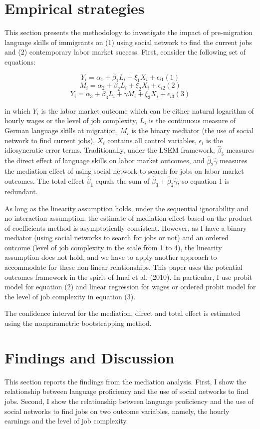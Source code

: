 \documentclass[12pt,a4paper]{article}
\begin{document}
\section{Empirical strategies}

This section presents the methodology to investigate the impact of pre-migration language skills of immigrants on (1) using social network to find the current jobs and (2) contemporary labor market success. First, consider the following set of equations:

$$Y_{i} = \alpha_{1} + \beta_{1}L_{i} + \xi_{1}X_{i} + \epsilon_{i1} (1)$$
$$M_{i} = \alpha_{2} + \beta_{2}L_{i} + \xi_{2}X_{i} + \epsilon_{i2} (2) $$
$$Y_{i} = \alpha_{3} + \beta_{3}L_{i} + \gamma M_{i} + \xi_{3}X_{i} + \epsilon_{i3} (3)$$

in which $Y_{i}$ is the labor market outcome which can be either natural logarithm of hourly wages or the level of job complexity, $L_{i}$ is the continuous measure of German language skills at migration, $M_{i}$ is the binary mediator (the use of social network to find current jobs), $X_{i}$ contains all control variables, $\epsilon_{i}$ is the idiosyncratic error terms. Traditionally, under the LSEM framework, $\hat \beta_{3}$ measures the direct effect of language skills on labor market outcomes, and $\hat \beta_{2}\hat \gamma$ measures the mediation effect of using social network to search for jobs on labor market outcomes. The total effect $\hat \beta_{1}$ equals the sum of $\hat \beta_{3} + \hat \beta_{2}\hat \gamma$, so equation 1 is redundant. 

As long as the linearity assumption holds, under the sequential ignorability and no-interaction assumption, the estimate of mediation effect based on the product of coefficients method is asymptotically consistent. However, as I have a binary mediator (using social networks to search for jobs or not) and an ordered outcome (level of job complexity in the scale from 1 to 4), the linearity assumption does not hold, and we have to apply another approach to accommodate for these non-linear relationships. This paper uses the potential outcomes framework in the spirit of Imai et al. (2010). In particular, I use probit model for equation (2) and linear regression for wages or ordered probit model for the level of job complexity in equation (3).

The confidence interval for the mediation, direct and total effect is estimated using the nonparametric bootstrapping method.

\section{Findings and Discussion}
This section reports the findings from the mediation analysis. First, I show the relationship between language proficiency and the use of social networks to find jobs. Second, I show the relationship between language proficiency and the use of social networks to find jobs on two outcome variables, namely, the hourly earnings and the level of job complexity.
\end{document}
